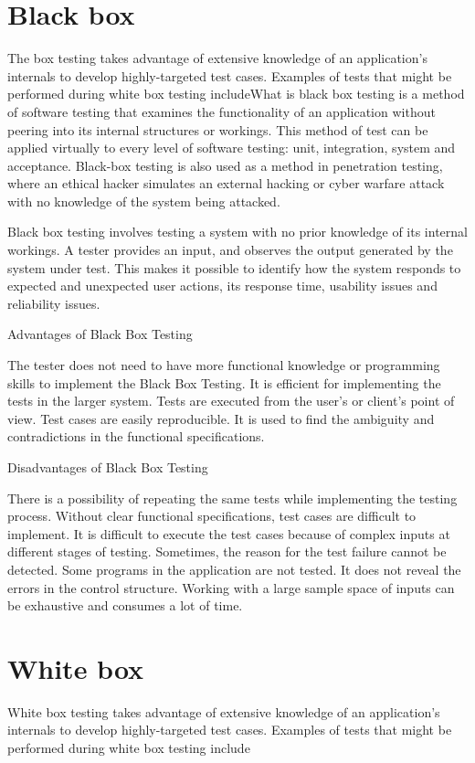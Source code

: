\documentclass{article}
\begin{document}
\section{Black box}
The box testing takes advantage of extensive knowledge of an application’s internals to develop highly-targeted test cases. Examples of tests that might be performed during white box testing includeWhat is black box testing is a method of software testing that examines the functionality of an application without peering into its internal structures or workings. This method of test can be applied virtually to every level of software testing: unit, integration, system and acceptance. Black-box testing is also used as a method in penetration testing, where an ethical hacker simulates an external hacking or cyber warfare attack with no knowledge of the system being attacked. 

Black box testing involves testing a system with no prior knowledge of its internal workings. A tester provides an input, and observes the output generated by the system under test. This makes it possible to identify how the system responds to expected and unexpected user actions, its response time, usability issues and reliability issues.

Advantages of Black Box Testing

The tester does not need to have more functional knowledge or programming skills to implement the Black Box Testing.
It is efficient for implementing the tests in the larger system.
Tests are executed from the user’s or client’s point of view.
Test cases are easily reproducible.
It is used to find the ambiguity and contradictions in the functional specifications.

Disadvantages of Black Box Testing

There is a possibility of repeating the same tests while implementing the testing process.
Without clear functional specifications, test cases are difficult to implement.
It is difficult to execute the test cases because of complex inputs at different stages of testing.
Sometimes, the reason for the test failure cannot be detected.
Some programs in the application are not tested.
It does not reveal the errors in the control structure.
Working with a large sample space of inputs can be exhaustive and consumes a lot of time.

\section{White box}
White box testing takes advantage of extensive knowledge of an application's internals to develop highly-targeted test cases. Examples of tests that might be performed during white box testing include
\end{document}
